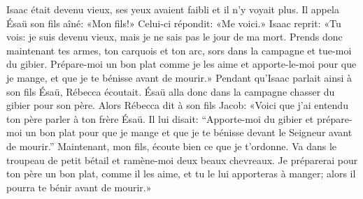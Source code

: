 Isaac était devenu vieux, ses yeux avaient faibli et il n’y voyait plus.
Il appela Ésaü son fils aîné: «Mon fils!»
	Celui-ci répondit: «Me voici.»
Isaac reprit: «Tu vois: je suis devenu vieux,
	mais je ne sais pas le jour de ma mort.
Prends donc maintenant tes armes, ton carquois et ton arc,
	sors dans la campagne et tue-moi du gibier.
Prépare-moi un bon plat comme je les aime et apporte-le-moi pour que je mange,
	et que je te bénisse avant de mourir.»
Pendant qu’Isaac parlait ainsi à son fils Ésaü, Rébecca écoutait.
Ésaü alla donc dans la campagne chasser du gibier pour son père.
Alors Rébecca dit à son fils Jacob:
	«Voici que j’ai entendu ton père parler à ton frère Ésaü.
Il lui disait: “Apporte-moi du gibier
	et prépare-moi un bon plat pour que je mange
		et que je te bénisse devant le Seigneur avant de mourir.”
Maintenant, mon fils, écoute bien ce que je t’ordonne.
Va dans le troupeau de petit bétail et ramène-moi deux beaux chevreaux.
Je préparerai pour ton père un bon plat, comme il les aime,
	et tu le lui apporteras à manger;
	alors il pourra te bénir avant de mourir.»
